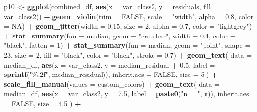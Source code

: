 \documentclass[
]{article}
\newenvironment{Shaded}{\begin{snugshade}}{\end{snugshade}}
\newcommand{\AttributeTok}[1]{\textcolor[rgb]{0.13,0.29,0.53}{#1}}
\newcommand{\ConstantTok}[1]{\textcolor[rgb]{0.56,0.35,0.01}{#1}}
\newcommand{\DecValTok}[1]{\textcolor[rgb]{0.00,0.00,0.81}{#1}}
\newcommand{\FloatTok}[1]{\textcolor[rgb]{0.00,0.00,0.81}{#1}}
\newcommand{\FunctionTok}[1]{\textcolor[rgb]{0.13,0.29,0.53}{\textbf{#1}}}
\newcommand{\NormalTok}[1]{#1}
\newcommand{\OtherTok}[1]{\textcolor[rgb]{0.56,0.35,0.01}{#1}}
\newcommand{\SpecialCharTok}[1]{\textcolor[rgb]{0.81,0.36,0.00}{\textbf{#1}}}
\newcommand{\StringTok}[1]{\textcolor[rgb]{0.31,0.60,0.02}{#1}}
\begin{document}
\begin{Shaded}
\begin{Highlighting}[]
\NormalTok{p10 }\OtherTok{\textless{}{-}} \FunctionTok{ggplot}\NormalTok{(combined\_df, }\FunctionTok{aes}\NormalTok{(}\AttributeTok{x =}\NormalTok{ var\_class2, }\AttributeTok{y =}\NormalTok{ residuals, }\AttributeTok{fill =}\NormalTok{ var\_class2)) }\SpecialCharTok{+}
  \FunctionTok{geom\_violin}\NormalTok{(}\AttributeTok{trim =} \ConstantTok{FALSE}\NormalTok{, }\AttributeTok{scale =} \StringTok{"width"}\NormalTok{, }\AttributeTok{alpha =} \FloatTok{0.8}\NormalTok{, }\AttributeTok{color =} \ConstantTok{NA}\NormalTok{) }\SpecialCharTok{+}
  \FunctionTok{geom\_jitter}\NormalTok{(}\AttributeTok{width =} \FloatTok{0.15}\NormalTok{, }\AttributeTok{size =} \DecValTok{2}\NormalTok{, }\AttributeTok{alpha =} \FloatTok{0.7}\NormalTok{, }\AttributeTok{color =} \StringTok{"lightgrey"}\NormalTok{) }\SpecialCharTok{+}
  \FunctionTok{stat\_summary}\NormalTok{(}\AttributeTok{fun =}\NormalTok{ median, }\AttributeTok{geom =} \StringTok{"crossbar"}\NormalTok{, }\AttributeTok{width =} \FloatTok{0.4}\NormalTok{, }\AttributeTok{color =} \StringTok{"black"}\NormalTok{, }\AttributeTok{fatten =} \DecValTok{1}\NormalTok{) }\SpecialCharTok{+}
  \FunctionTok{stat\_summary}\NormalTok{(}\AttributeTok{fun =}\NormalTok{ median, }\AttributeTok{geom =} \StringTok{"point"}\NormalTok{, }\AttributeTok{shape =} \DecValTok{23}\NormalTok{, }\AttributeTok{size =} \DecValTok{2}\NormalTok{, }\AttributeTok{fill =} \StringTok{"black"}\NormalTok{, }\AttributeTok{color =} \StringTok{"black"}\NormalTok{, }\AttributeTok{stroke =} \FloatTok{0.7}\NormalTok{) }\SpecialCharTok{+}
  \FunctionTok{geom\_text}\NormalTok{(}
  \AttributeTok{data =}\NormalTok{ median\_df,}
  \FunctionTok{aes}\NormalTok{(}\AttributeTok{x =}\NormalTok{ var\_class2, }\AttributeTok{y =}\NormalTok{ median\_residual }\SpecialCharTok{+} \FloatTok{0.5}\NormalTok{, }\AttributeTok{label =} \FunctionTok{sprintf}\NormalTok{(}\StringTok{"\%.2f"}\NormalTok{, median\_residual)),}
  \AttributeTok{inherit.aes =} \ConstantTok{FALSE}\NormalTok{,}
  \AttributeTok{size =} \DecValTok{5}
\NormalTok{) }\SpecialCharTok{+}
  \FunctionTok{scale\_fill\_manual}\NormalTok{(}\AttributeTok{values =}\NormalTok{ custom\_colors) }\SpecialCharTok{+}
  \FunctionTok{geom\_text}\NormalTok{(}
    \AttributeTok{data =}\NormalTok{ median\_df,}
    \FunctionTok{aes}\NormalTok{(}\AttributeTok{x =}\NormalTok{ var\_class2, }\AttributeTok{y =} \FloatTok{7.5}\NormalTok{, }\AttributeTok{label =} \FunctionTok{paste0}\NormalTok{(}\StringTok{"n = "}\NormalTok{, n)),}
    \AttributeTok{inherit.aes =} \ConstantTok{FALSE}\NormalTok{,}
    \AttributeTok{size =} \FloatTok{4.5}
\NormalTok{  ) }\SpecialCharTok{+}

\end{Highlighting}
\end{Shaded}
\end{document}
